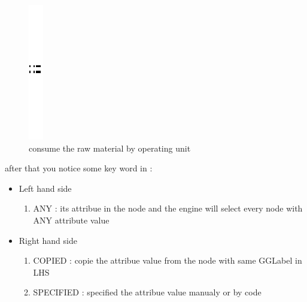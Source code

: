  
\vspace{1cm}
\begin{figure}[th]
\centering


\quad{}\quad{}
\includegraphics{Chapiter3/img/sep}
\quad{}\quad{}

\caption{\label{fig:consume the raw material by operating unit} consume the raw material by operating unit}
 
\end{figure}
\vspace{1cm}

after that you notice some key word in  :
\begin{itemize}
\item Left hand side
	\begin{enumerate}
	\item ANY : its attribue in the node and the engine will select every node with ANY attribute value
	\end{enumerate}
\item  Right hand side
	\begin{enumerate}
	\item COPIED : copie the attribue value from the node with same GGLabel in LHS
	\item SPECIFIED : specified the attribue value manualy or by code 
	\end{enumerate}
\end{itemize}
 
